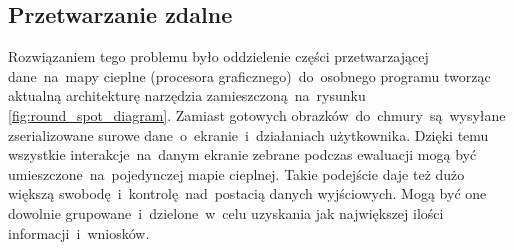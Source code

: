 \subsection{Przetwarzanie zdalne}
Rozwiązaniem tego problemu było oddzielenie części przetwarzającej dane~na~mapy cieplne (procesora graficznego)~do~osobnego programu tworząc aktualną architekturę narzędzia zamieszczoną~na~rysunku \ref{fig:round_spot_diagram}. Zamiast gotowych obrazków~do~chmury~są~wysyłane zserializowane surowe dane~o~ekranie~i~działaniach użytkownika. Dzięki temu wszystkie interakcje~na~danym ekranie zebrane podczas ewaluacji mogą być umieszczone~na~pojedynczej mapie cieplnej. Takie podejście daje też dużo większą swobodę~i~kontrolę~nad~postacią danych wyjściowych. Mogą być one dowolnie grupowane~i~dzielone~w~celu uzyskania jak największej ilości informacji~i~wniosków.
